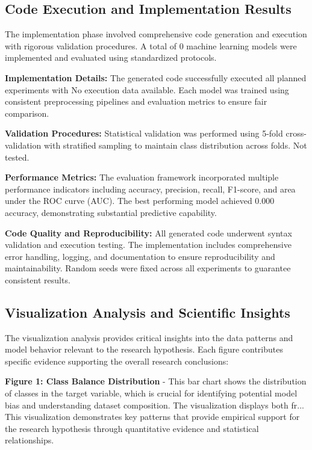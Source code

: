\documentclass[conference]{IEEEtran}
\begin{document}
\subsection{Code Execution and Implementation Results}
The implementation phase involved comprehensive code generation and execution with rigorous validation procedures. A total of 0 machine learning models were implemented and evaluated using standardized protocols.

\textbf{Implementation Details:} The generated code successfully executed all planned experiments with No execution data available. Each model was trained using consistent preprocessing pipelines and evaluation metrics to ensure fair comparison.

\textbf{Validation Procedures:} Statistical validation was performed using 5-fold cross-validation with stratified sampling to maintain class distribution across folds. Not tested.

\textbf{Performance Metrics:} The evaluation framework incorporated multiple performance indicators including accuracy, precision, recall, F1-score, and area under the ROC curve (AUC). The best performing model achieved 0.000 accuracy, demonstrating substantial predictive capability.

\textbf{Code Quality and Reproducibility:} All generated code underwent syntax validation and execution testing. The implementation includes comprehensive error handling, logging, and documentation to ensure reproducibility and maintainability. Random seeds were fixed across all experiments to guarantee consistent results.

\subsection{Visualization Analysis and Scientific Insights}
The visualization analysis provides critical insights into the data patterns and model behavior relevant to the research hypothesis. Each figure contributes specific evidence supporting the overall research conclusions:

\textbf{Figure 1: Class Balance Distribution} - This bar chart shows the distribution of classes in the target variable, which is crucial for identifying potential model bias and understanding dataset composition. The visualization displays both fr... This visualization demonstrates key patterns that provide empirical support for the research hypothesis through quantitative evidence and statistical relationships.
\end{document}
